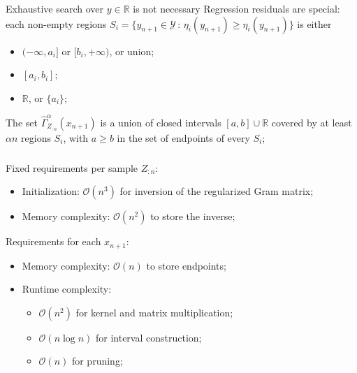 \documentclass[t]{beamer}  %
\newcommand{\Ycal}{\mathcal{Y}}
\newcommand{\Ocal}{\mathcal{O}}
\newcommand{\Real}{\mathbb{R}}
\begin{document}
\begin{frame}[c]\frametitle{\insertsection}
  \framesubtitle{\insertsubsection}
  \begin{block}{Exhaustive search over $y\in \Real$ is not necessary}
    Regression residuals are special: each non-empty regions
    $S_i = \{y_{n+1}\in \Ycal \,:\, \eta_i(y_{n+1}) \geq \eta_i(y_{n+1})\}$
    is either \begin{itemize}
      \item $(-\infty, a_i]$ or $[b_i, +\infty)$, or union;
      \item $[a_i, b_i]$;
      \item $\Real$, or $\{a_i\}$;
    \end{itemize}
    \vspace{\baselineskip}
    The set $\hat{\Gamma}_{Z_{:n}}^\alpha(x_{n+1})$ is a union of closed intervals
    $[a, b]\cup\Real$ covered by at least $\alpha n$ regions $S_i$, with $a\geq b$
    in the set of endpoints of every $S_i$;
  \end{block}
\end{frame}

\begin{frame}[c]\frametitle{\insertsection}
\framesubtitle{\insertsubsection}
  Fixed requirements per sample $Z_{:n}$: \begin{itemize}
    \item Initialization: $\Ocal(n^3)$ for inversion of the regularized Gram matrix;
    \item Memory complexity: $\Ocal(n^2)$ to store the inverse;
  \end{itemize}
  \vspace{\baselineskip}
  Requirements for each $x_{n+1}$:
  \begin{itemize}
    \item Memory complexity: $\Ocal(n)$ to store endpoints;
    \item Runtime complexity: \begin{itemize}
      \item $\Ocal(n^2)$ for kernel and matrix multiplication;
      \item $\Ocal(n \log n)$ for interval construction;
      \item $\Ocal(n)$ for pruning;
    \end{itemize}
  \end{itemize}
\end{frame}

\end{document}
